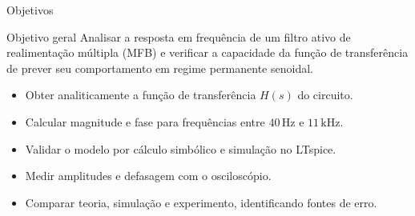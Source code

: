 \begin{frame}{Objetivos}
  \begin{block}{Objetivo geral}
    Analisar a resposta em frequência de um filtro ativo de realimentação múltipla
    (MFB) e verificar a capacidade da função de transferência de prever seu
    comportamento em regime permanente senoidal.
  \end{block}

  \begin{itemize}
    \item Obter analiticamente a função de transferência $H(s)$ do circuito.
    \item Calcular magnitude e fase para frequências entre $40\,\mathrm{Hz}$ e
      $11\,\mathrm{kHz}$.
    \item Validar o modelo por cálculo simbólico e simulação no LTspice.
    \item Medir amplitudes e defasagem com o osciloscópio.
    \item Comparar teoria, simulação e experimento, identificando fontes de erro.
  \end{itemize}
\end{frame}